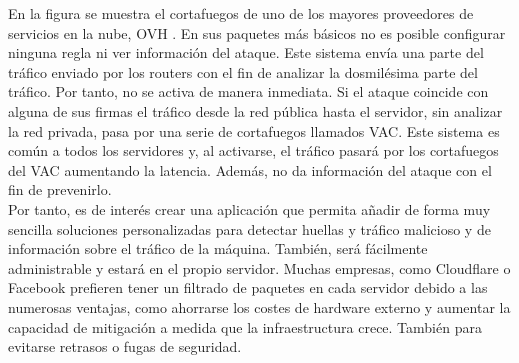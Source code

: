 En la figura se muestra el cortafuegos de uno de los mayores proveedores de servicios en la nube, OVH \cite{ovhAntidDDOs}. En sus paquetes más básicos no es posible configurar ninguna regla ni ver información del ataque. Este sistema envía una parte del tráfico enviado por los routers con el fin de analizar la dosmilésima parte del tráfico. Por tanto, no se activa de manera inmediata. Si el ataque coincide con alguna de sus firmas el tráfico desde la red pública hasta el servidor, sin analizar la red privada, pasa por una serie de cortafuegos llamados VAC. Este sistema es común a todos los servidores y, al activarse, el tráfico pasará por los cortafuegos del VAC aumentando la latencia. Además, no da información del ataque con el fin de prevenirlo. 
\\Por tanto, es de interés crear una aplicación que permita añadir de forma muy sencilla soluciones personalizadas para detectar huellas y tráfico malicioso y de información sobre el tráfico de la máquina. También, será fácilmente administrable y estará en el propio servidor. Muchas empresas, como Cloudflare \cite{mtvDDOSCLoudflare} o Facebook \cite{mtvDDOSFacebook} prefieren tener un filtrado de paquetes en cada servidor debido a las numerosas ventajas, como ahorrarse los costes de hardware externo y aumentar la capacidad de mitigación a medida que la infraestructura crece. También para evitarse retrasos o fugas de seguridad.